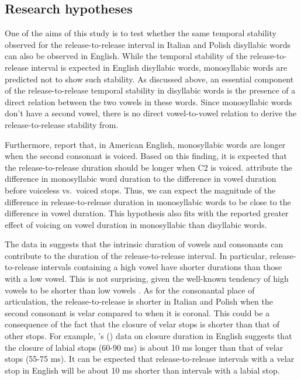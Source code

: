 \documentclass[
  12pt,
  a4paper,
  authoryear, 5p]{elsarticle}
\begin{document}
\hypertarget{research-hypotheses}{%
\subsection{Research hypotheses}\label{research-hypotheses}}

\label{s:hypo}

One of the aims of this study is to test whether the same temporal
stability observed for the release-to-release interval in Italian and
Polish disyllabic words can also be observed in English. While the
temporal stability of the release-to-release interval is expected in
English disyllabic words, monosyllabic words are predicted not to show
such stability. As discussed above, an essential component of the
release-to-release temporal stability in disyllabic words is the
presence of a direct relation between the two vowels in these words.
Since monosyllabic words don't have a second vowel, there is no direct
vowel-to-vowel relation to derive the release-to-release stability from.

Furthermore, \citet{jacewicz2009} report that, in American English,
monosyllabic words are longer when the second consonant is voiced. Based
on this finding, it is expected that the release-to-release duration
should be longer when C2 is voiced. \citet{jacewicz2009} attribute the
difference in monosyllabic word duration to the difference in vowel
duration before voiceless vs.~voiced stops. Thus, we can expect the
magnitude of the difference in release-to-release duration in
monosyllabic words to be close to the difference in vowel duration. This
hypothesis also fits with the reported greater effect of voicing on
vowel duration in monosyllabic than disyllabic words.

The data in \citet{coretta2018j} suggests that the intrinsic duration of
vowels and consonants can contribute to the duration of the
release-to-release interval. In particular, release-to-release intervals
containing a high vowel have shorter durations than those with a low
vowel. This is not surprising, given the well-known tendency of high
vowels to be shorter than low vowels
\citep{hertrich1997, esposito2002, mortensen2013, toivonen2015, kawahara2017}.
As for the consonantal place of articulation, the release-to-release is
shorter in Italian and Polish when the second consonant is velar
compared to when it is coronal. This could be a consequence of the fact
that the closure of velar stops is shorter than that of other stops. For
example, \citeauthor{sharf1962}'s (\citeyear{sharf1962}) data on closure
duration in English suggests that the closure of labial stops (60-90 ms)
is about 10 ms longer than that of velar stops (55-75 ms). It can be
expected that release-to-release intervals with a velar stop in English
will be about 10 ms shorter than intervals with a labial stop.
\end{document}
